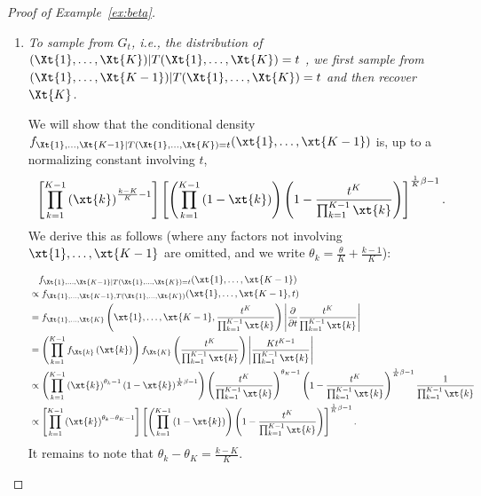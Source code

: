 \documentclass[12pt]{article}
\begin{document}
\begin{proof}[Proof of Example~\ref{ex:beta}]
\begin{enumerate}
\begin{align*} 
f_{\Xt{1},\dots,\Xt{K}}(\xt{1},\dots,\xt{K}) &= \prod_{k=1}^K f_{\Xt{k}}(\xt{k}) \\
&\propto \prod_{k=1}^K \left(\xt{k}\right)^{\frac{1}{K}\theta + \frac{k-1}{K} - 1}\left(1-\xt{k}\right)^{\frac{1}{K}\beta-1} \\
&=\left[\left(\prod_{k=1}^K \xt{k}\right)^{\frac{1}{K}}\right]^{\theta}\left[\prod_{k=1}^K \left(\xt{k}\right)^{\frac{k-1}{K}-1}\right]\left[\prod_{k=1}^K\left(1-\xt{k}\right)\right]^{\frac{1}{K}\beta-1}.
\end{align*}

    By the factorization theorem, $T(\Xt{1},\dots,\Xt{K})=\left(\prod_{k=1}^K \Xt{k}\right)^{\frac{1}{K}}$ is a sufficient statistic for $\theta$.

    \item \emph{To sample from $G_t$, i.e., the distribution of $(\Xt{1},\dots,\Xt{K})|T(\Xt{1},\dots,\Xt{K})=t$ 
    , we first sample from $(\Xt{1},\dots,\Xt{K-1})|T(\Xt{1},\dots,\Xt{K})=t$ and then recover $\Xt{K}$.}

We will show that the conditional density $f_{\Xt{1},\dots,\Xt{K-1}|T(\Xt{1},\dots,\Xt{K})=t}(\xt{1},\dots,\xt{K-1})$ is, up to a normalizing constant involving $t$, 
$$
\left[\prod_{k=1}^{K-1}\left(\xt{k}\right)^{\frac{k-K}{K}-1}\right]\left[\left(\prod_{k=1}^{K-1}\left(1-\xt{k}\right)\right)\left(1-\frac{t^K}{\prod_{k=1}^{K-1}\xt{k}}\right)\right]^{\frac{1}{K}\beta-1}.$$
We derive this as follows (where any factors not involving $\xt{1},\ldots,\xt{K-1}$ are omitted, and we write $\theta_k=\frac{\theta}{K}+\frac{k-1}{K}$):

\begin{align*}
&\quad f_{\Xt{1},\dots,\Xt{K-1}|T(\Xt{1},\dots,\Xt{K})=t}(\xt{1},\dots,\xt{K-1}) \\ 
&\propto f_{\Xt{1},\dots,\Xt{K-1},T(\Xt{1},\dots,\Xt{K})}(\xt{1},\dots,\xt{K-1},t) \\
&= f_{\Xt{1},\dots,\Xt{K}}\left(\xt{1},\dots,\xt{K-1},\frac{t^K}{\prod_{k=1}^{K-1}\xt{k}}\right)\left|\frac{\partial}{\partial t}\frac{t^K}{\prod_{k=1}^{K-1}\xt{k}}\right| \\
&=\left(\prod_{k=1}^{K-1}f_{\Xt{k}}\left(\xt{k}\right)\right)f_{\Xt{K}}\left(\frac{t^K}{\prod_{k=1}^{K-1}\xt{k}}\right)\left|\frac{Kt^{K-1}}{\prod_{k=1}^{K-1}\xt{k}}\right| \\
&\propto \left(\prod_{k=1}^{K-1}\left(\xt{k}\right)^{\theta_k-1}\left(1-\xt{k}\right)^{\frac{1}{K}\beta-1}\right) \left(\frac{t^K}{\prod_{k=1}^{K-1}\xt{k}}\right)^{\theta_K-1}\left(1-\frac{t^K}{\prod_{k=1}^{K-1}\xt{k}}\right)^{\frac{1}{K}\beta-1}\frac{1}{\prod_{k=1}^{K-1}\xt{k}} \\
&\propto \left[\prod_{k=1}^{K-1}\left(\xt{k}\right)^{\theta_k-\theta_K-1}\right]\left[\left(\prod_{k=1}^{K-1}\left(1-\xt{k}\right)\right)\left(1-\frac{t^K}{\prod_{k=1}^{K-1}\xt{k}}\right)\right]^{\frac{1}{K}\beta-1}.
\end{align*}
It remains to note that $\theta_k-\theta_K=\frac{k-K}{K}$.


\end{enumerate}
\end{proof}
\end{document}

